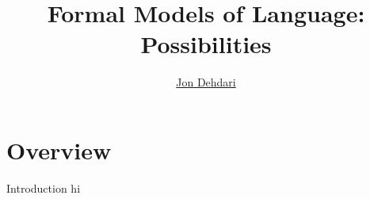 \documentclass{beamer}
\begin{document}
\title{Formal Models of Language: \\[1.0em] \small{Possibilities}}
\author{\href{http://jon.dehdari.org}{Jon Dehdari}}
\frame{\titlepage}

\section{Overview}
\begin{frame}{Introduction}
hi
\end{frame}

\end{document}

